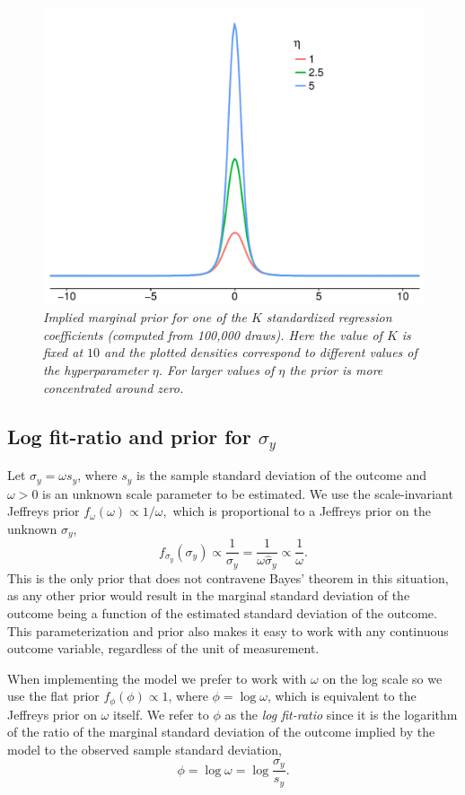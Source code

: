 \documentclass[11pt]{article}
\begin{document}
\begin{figure}
\centering
\includegraphics[width=.67\textwidth]{betaplot.pdf}{\vspace{-.25cm}}
\caption{\em \small Implied marginal prior for one of the $K$ standardized
regression coefficients (computed from 100,000 draws). Here the value of $K$ is
fixed at $10$ and the plotted densities correspond to different values of the
hyperparameter $\eta$. For larger values of $\eta$ the prior is more
concentrated around zero.}
\label{fig:betaplot}
\end{figure}

\subsection{Log fit-ratio and prior for $\sigma_y$}
Let $\sigma_y = \omega s_y$, where $s_y$ is the sample standard deviation of the
outcome and $\omega > 0$ is an unknown scale parameter to be estimated. We use
the scale-invariant Jeffreys prior
$f_\omega \left(\omega\right) \propto 1 / \omega,$
which is proportional to a Jeffreys prior on the unknown $\sigma_y$,
$$f_{\sigma_y} \left(\sigma_y\right) \propto \frac{1}{\sigma_y}
= \frac{1}{\omega \widehat{\sigma}_y} \propto \frac{1}{\omega}.$$
This is the only prior that does not contravene Bayes' theorem in this
situation, as any other prior would result in the marginal standard deviation of
the outcome being a function of the estimated standard deviation of the outcome.
This parameterization and prior also makes it easy to work with any continuous
outcome variable, regardless of the unit of measurement.

When implementing the model we prefer to work with $\omega$ on the log scale
so we use the flat prior $f_\phi(\phi) \propto 1$, where $\phi =
\log{\omega}$, which is equivalent to the Jeffreys prior on $\omega$ itself. We
refer to $\phi$ as the \emph{log fit-ratio} since it is the logarithm of the
ratio of the marginal standard deviation of the outcome implied by the model to
the observed sample standard deviation,
%
$$\phi = \log{\omega} = \log{\frac{\sigma_y}{s_y}}.$$
\end{document}
